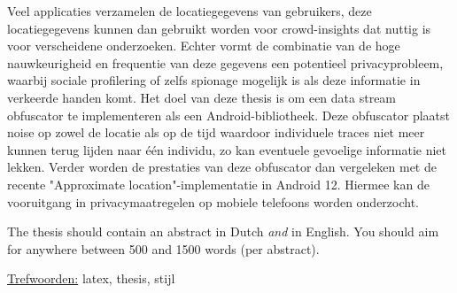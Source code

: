 Veel applicaties verzamelen de locatiegegevens van gebruikers, deze locatiegegevens kunnen dan gebruikt worden voor crowd-insights dat nuttig is voor verscheidene onderzoeken. Echter vormt de combinatie van de hoge nauwkeurigheid en frequentie van deze gegevens een potentieel privacyprobleem, waarbij sociale profilering of zelfs spionage mogelijk is als deze informatie in verkeerde handen komt. 
Het doel van deze thesis is om een data stream obfuscator te implementeren als een Android-bibliotheek. Deze obfuscator plaatst noise op zowel de locatie als op de tijd waardoor individuele traces niet meer kunnen terug lijden naar één individu, zo kan eventuele gevoelige informatie niet lekken. Verder worden de prestaties van deze obfuscator dan vergeleken met de recente "Approximate location"-implementatie in Android 12. Hiermee kan de vooruitgang in privacymaatregelen op mobiele telefoons worden onderzocht.

The thesis should contain an abstract in Dutch \emph{and} in English.
You should aim for anywhere between 500 and 1500 words (per abstract).

\underline{Trefwoorden:} latex, thesis, stijl